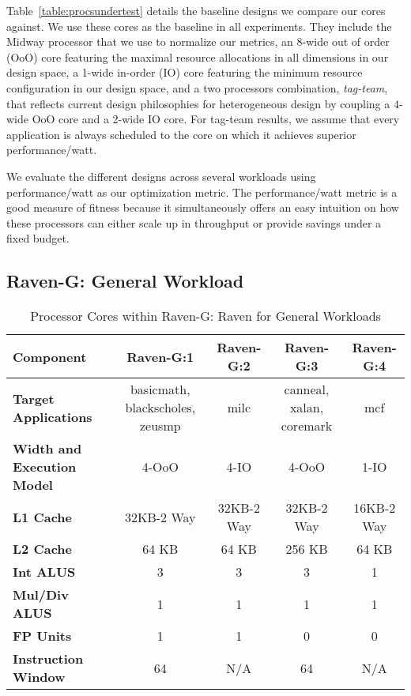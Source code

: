 Table~\ref{table:procsundertest} details the baseline designs we
compare our \Ravan{} cores against. We use these cores as the baseline
in all experiments.  They include the Midway processor that we use to
normalize our metrics, an 8-wide out of order (OoO) core featuring the
maximal resource allocations in all dimensions in our design space, a
1-wide in-order (IO) core featuring the minimum resource configuration
in our design space, and a two processors combination,
\emph{tag-team}, that reflects current design philosophies for
heterogeneous design by coupling a 4-wide OoO core and a 2-wide IO
core. For tag-team results, we assume that every application is always
scheduled to the core on which it achieves superior performance/watt.

We evaluate the different designs across several workloads using
performance/watt as our optimization metric. The performance/watt
metric is a good measure of fitness because it simultaneously offers
an easy intuition on how these processors can either scale up in
throughput or provide savings under a fixed budget.


\subsection{Raven-G: General Workload}

\begin{center}
\begin{table*}[htbp!]
{\small
\hfill{}
\begin{tabular}{|l|c|c|c|c|}
\hline
\textbf{Component}&\textbf{Raven-G:1}&\textbf{Raven-G:2}&\textbf{Raven-G:3}&\textbf{Raven-G:4}\\
\hline
\textbf{Target Applications}&basicmath, blackscholes, zeusmp&milc&canneal, xalan, coremark&mcf\\
\hline
\textbf{Width and Execution Model}&4-OoO&4-IO&4-OoO&1-IO\\
\hline
\textbf{L1 Cache}&32KB-2 Way&32KB-2 Way&32KB-2 Way&16KB-2 Way\\
\hline
\textbf{L2 Cache}&64 KB&64 KB&256 KB&64 KB\\
\hline
\textbf{Int ALUS}&3&3&3&1\\
\hline
\textbf{Mul/Div ALUS}&1&1&1&1\\
\hline
\textbf{FP Units}&1&1&0&0\\
\hline
\textbf{Instruction Window}&64&N/A&64&N/A\\
\hline
\end{tabular}}
\hfill{}
\caption{Processor Cores within Raven-G: Raven for General Workloads}
\label{table:raveng}
\end{table*}
\end{center}

